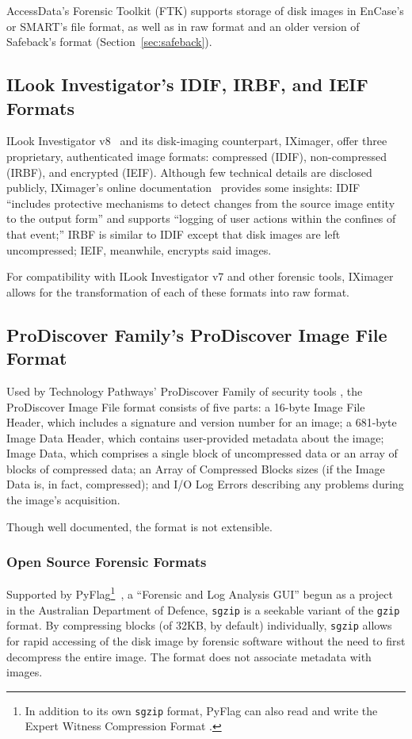 AccessData's Forensic Toolkit (FTK)
supports storage of disk images in EnCase's or SMART's file format,
as well as in raw format and an older version of Safeback's format
(Section~\ref{sec:safeback}). 

\subsection{ILook Investigator's IDIF, IRBF, and IEIF Formats}
ILook Investigator v8~\cite{ILookv8} and its disk-imaging
counterpart, IXimager, offer three proprietary, authenticated image
formats: compressed (IDIF), non-compressed (IRBF), and encrypted
(IEIF). Although few technical details are disclosed publicly,
IXimager's online documentation~\cite{IXimager} provides some
insights:  IDIF ``includes protective mechanisms to detect changes
from the source image entity to the output form'' and supports
``logging of user actions within the confines of that event;''  IRBF
is similar to IDIF except that disk images are left uncompressed;
IEIF, meanwhile, encrypts said images.

For compatibility with ILook Investigator v7 and other forensic
tools, IXimager allows for the transformation of each of these
formats into raw format.

\subsection{ProDiscover Family's ProDiscover Image File Format}
Used by Technology Pathways' ProDiscover Family of security tools
\cite{prodiscover}, the ProDiscover Image File format
\cite{prodiscoverformat} consists of five parts: a 16-byte Image
File Header, which includes a signature and version number for an
image; a 681-byte Image Data Header, which contains user-provided
metadata about the image; Image Data, which comprises a single block
of uncompressed data or an array of blocks of compressed data; an
Array of Compressed Blocks sizes (if the Image Data is, in fact,
compressed); and I/O Log Errors describing any problems during the
image's acquisition.

Though well documented, the format is not extensible.


\subsubsection{Open Source Forensic Formats}

Supported by PyFlag\footnote{In addition to its own {\tt sgzip} format,
PyFlag can also read and write the Expert Witness Compression Format
\cite{pyflagiosources}.}~\cite{pyflag}, a ``Forensic and Log
Analysis GUI'' begun as a project in the Australian Department of
Defence, {\tt sgzip} is a seekable variant of the {\tt gzip} format.  By
compressing blocks (of 32KB, by default) individually, {\tt sgzip} allows
for rapid accessing of the disk image by forensic software without the
need to first decompress the entire image. The format does not associate metadata with images.
\cite{pyflagdiskforensics,pyflagiosources}



